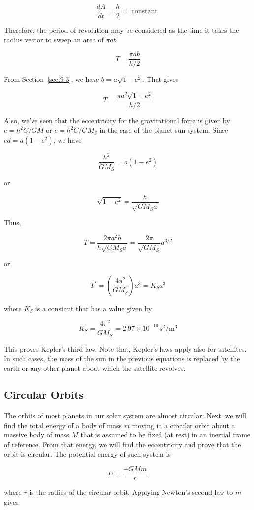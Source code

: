 \documentclass[10pt]{article}
\numberwithin{equation}{section}
\begin{document}
$$
\frac{d A}{d t}=\frac{h}{2}=\text { constant }
$$

Therefore, the period of revolution may be considered as the time it takes the radius vector to sweep an area of $\pi a b$

$$
T=\frac{\pi a b}{h / 2}
$$

From Section~\ref{sec:9-3}, we have $b=a \sqrt{1-e^{2}}$. That gives

$$
T=\frac{\pi a^{2} \sqrt{1-e^{2}}}{h / 2}
$$

Also, we've seen that the eccentricity for the gravitational force is given by $e=h^{2} C / G M$ or $e=h^{2} C / G M_{S}$ in the case of the planet-sun system. Since $e d=a\left(1-e^{2}\right)$, we have

$$
\frac{h^{2}}{G M_{S}}=a\left(1-e^{2}\right)
$$

or

$$
\sqrt{1-e^{2}}=\frac{h}{\sqrt{G M_{S} a}}
$$

Thus,

$$
T=\frac{2 \pi a^{2} h}{h \sqrt{G M_{S} a}}=\frac{2 \pi}{\sqrt{G M_{S}}} a^{3 / 2}
$$

or

$$
T^{2}=\left(\frac{4 \pi^{2}}{G M_{S}}\right) a^{3}=K_{S} a^{3}
$$

where $K_{S}$ is a constant that has a value given by

$$
K_{S}=\frac{4 \pi^{2}}{G M_{S}}=2.97 \times 10^{-19} \mathrm{~s}^{2} / \mathrm{m}^{3}
$$

This proves Kepler's third law. Note that, Kepler's laws apply also for satellites. In such cases, the mass of the sun in the previous equations is replaced by the earth or any other planet about which the satellite revolves.

\subsection{Circular Orbits}\label{sec:9-5}
The orbits of most planets in our solar system are almost circular. Next, we will find the total energy of a body of mass $m$ moving in a circular orbit about a massive body of mass $M$ that is assumed to be fixed (at rest) in an inertial frame of reference. From that energy, we will find the eccentricity and prove that the orbit is circular. The potential energy of such system is

$$
U=\frac{-G M m}{r}
$$

where $r$ is the radius of the circular orbit. Applying Newton's second law to $m$ gives
\end{document}

